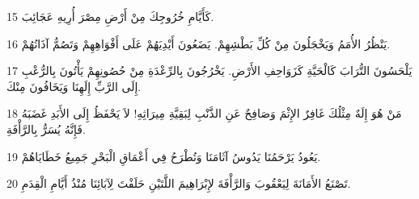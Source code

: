 \par 15 كَأَيَّامِ خُرُوجِكَ مِنْ أَرْضِ مِصْرَ أُرِيهِ عَجَائِبَ.
\par 16 يَنْظُرُ الأُمَمُ وَيَخْجَلُونَ مِنْ كُلِّ بَطْشِهِمْ. يَضَعُونَ أَيْدِيَهُمْ عَلَى أَفْوَاهِهِمْ وَتَصُمُّ آذَانُهُمْ.
\par 17 يَلْحَسُونَ التُّرَابَ كَالْحَيَّةِ كَزَوَاحِفِ الأَرْضِ. يَخْرُجُونَ بِالرِّعْدَةِ مِنْ حُصُونِهِمْ يَأْتُونَ بِالرُّعْبِ إِلَى الرَّبِّ إِلَهِنَا وَيَخَافُونَ مِنْكَ.
\par 18 مَنْ هُوَ إِلَهٌ مِثْلُكَ غَافِرٌ الإِثْمَ وَصَافِحٌ عَنِ الذَّنْبِ لِبَقِيَّةِ مِيرَاثِهِ! لاَ يَحْفَظُ إِلَى الأَبَدِ غَضَبَهُ فَإِنَّهُ يُسَرُّ بِالرَّأْفَةِ.
\par 19 يَعُودُ يَرْحَمُنَا يَدُوسُ آثَامَنَا وَتُطْرَحُ فِي أَعْمَاقِ الْبَحْرِ جَمِيعُ خَطَايَاهُمْ.
\par 20 تَصْنَعُ الأَمَانَةَ لِيَعْقُوبَ وَالرَّأْفَةَ لإِبْرَاهِيمَ اللَّتَيْنِ حَلَفْتَ لِآبَائِنَا مُنْذُ أَيَّامِ الْقِدَمِ.


